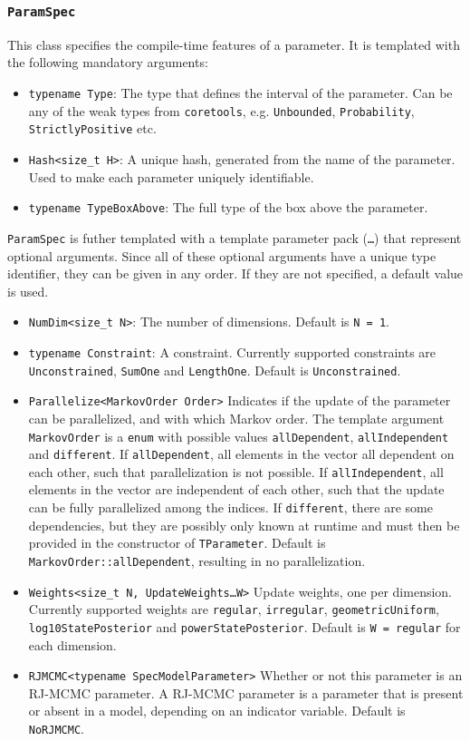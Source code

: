 \documentclass[a4paper,11pt]{article}
\def\coretools{\texttt{coretools}}
\newcommand{\class}[1]{\texttt{#1}}
\newcommand{\type}[1]{\texttt{#1}}
\begin{document}
\subsubsection{\class{ParamSpec}}
This class specifies the compile-time features of a parameter. It is templated with the following mandatory arguments:

\begin{itemize}
 \item \type{typename Type}: The type that defines the interval of the parameter. Can be any of the weak types from \coretools{}, e.g. \type{Unbounded}, \type{Probability}, \type{StrictlyPositive} etc.
 \item \type{Hash<size\_t H>}: A unique hash, generated from the name of the parameter. Used to make each parameter uniquely identifiable.
 \item \type{typename TypeBoxAbove}: The full type of the box above the parameter.
 \end{itemize}

\class{ParamSpec} is futher templated with a template parameter pack (\texttt{\ldots}) that represent optional arguments. Since all of these optional arguments have a unique type identifier, they can be given in any order. If they are not specified, a default value is used.
\begin{itemize}
 \item \type{NumDim<size\_t N>}: The number of dimensions. Default is \texttt{N = 1}.
 \item \type{typename Constraint}: A constraint. Currently supported constraints are \class{Unconstrained}, \class{SumOne} and \class{LengthOne}. Default is \class{Unconstrained}.
 \item \type{Parallelize<MarkovOrder Order>} Indicates if the update of the parameter can be parallelized, and with which Markov order. The template argument \texttt{MarkovOrder} is a \type{enum} with possible values \type{allDependent}, \type{allIndependent} and \type{different}. If \type{allDependent}, all elements in the vector all dependent on each other, such that parallelization is not possible. If \type{allIndependent}, all elements in the vector are independent of each other, such that the update can be fully parallelized among the indices. If \type{different}, there are some dependencies, but they are possibly only known at runtime and must then be provided in the constructor of \type{TParameter}. Default is \texttt{MarkovOrder::allDependent}, resulting in no parallelization.
 \item \type{Weights<size\_t N, UpdateWeights\ldots W>} Update weights, one per dimension. Currently supported weights are \type{regular}, \type{irregular}, \type{geometricUniform}, \type{log10StatePosterior} and \type{powerStatePosterior}. Default is \type{W = regular} for each dimension.
 \item \type{RJMCMC<typename SpecModelParameter>} Whether or not this parameter is an RJ-MCMC parameter. A RJ-MCMC parameter is a parameter that is present or absent in a model, depending on an indicator variable. Default is \type{NoRJMCMC}.
\end{itemize}
\end{document}
